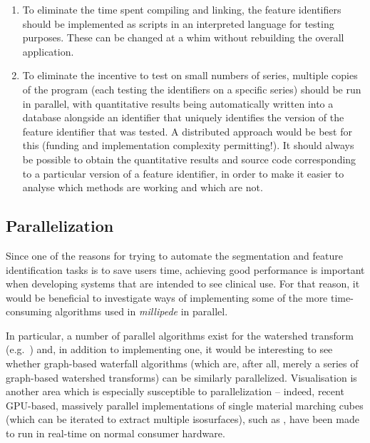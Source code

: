 \begin{itemize}
\begin{enumerate}
\item To eliminate the time spent compiling and linking, the feature identifiers should be implemented as scripts in an interpreted language for testing purposes. These can be changed at a whim without rebuilding the overall application.

\item To eliminate the incentive to test on small numbers of series, multiple copies of the program (each testing the identifiers on a specific series) should be run in parallel, with quantitative results being automatically written into a database alongside an identifier that uniquely identifies the version of the feature identifier that was tested. A distributed approach would be best for this (funding and implementation complexity permitting!). It should always be possible to obtain the quantitative results and source code corresponding to a particular version of a feature identifier, in order to make it easier to analyse which methods are working and which are not.

\end{enumerate}

\end{itemize}

\subsection{Parallelization}

Since one of the reasons for trying to automate the segmentation and feature identification tasks is to save users time, achieving good performance is important when developing systems that are intended to see clinical use. For that reason, it would be beneficial to investigate ways of implementing some of the more time-consuming algorithms used in \emph{millipede} in parallel.

In particular, a number of parallel algorithms exist for the watershed transform (e.g.~\cite{bieniek97,moga98}) and, in addition to implementing one, it would be interesting to see whether graph-based waterfall algorithms (which are, after all, merely a series of graph-based watershed transforms) can be similarly parallelized. Visualisation is another area which is especially susceptible to parallelization -- indeed, recent GPU-based, massively parallel implementations of single material marching cubes (which can be iterated to extract multiple isosurfaces), such as \cite{dyken08}, have been made to run in real-time on normal consumer hardware.

